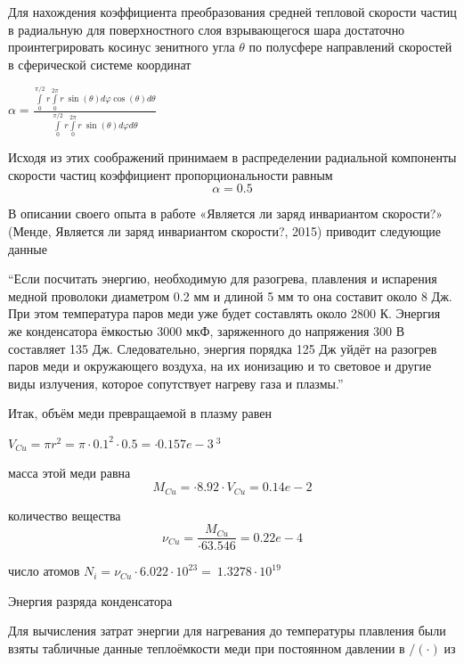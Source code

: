 \documentclass[12pt]{article}
\begin{document}
Для нахождения коэффициента преобразования средней тепловой скорости частиц в радиальную для поверхностного слоя взрывающегося шара достаточно проинтегрировать косинус зенитного угла $\theta$ по полусфере направлений скоростей в сферической системе координат

$\alpha =\frac{\int\limits_{0}^{\pi /2}{r\int\limits_{0}^{2\pi }{r\ \sin \left( \theta  \right)d\varphi \cos \left( \theta  \right)d\theta }}}{\int\limits_{0}^{\pi /2}{r\int\limits_{0}^{2\pi }{r\ \sin \left( \theta  \right)d\varphi d\theta }}}$


Исходя из этих соображений принимаем в распределении радиальной компоненты скорости частиц коэффициент пропорциональности равным $$\alpha = 0.5$$


В описании своего опыта в работе «Является ли заряд инвариантом скорости?» (Менде, Является ли заряд инвариантом скорости?, 2015) приводит следующие данные

“Если посчитать энергию, необходимую для разогрева, плавления и испарения медной проволоки диаметром 0.2 мм и длиной 5 мм то она составит около 8 Дж. При этом температура паров меди уже будет составлять около 2800 К. Энергия же конденсатора ёмкостью 3000 мкФ, заряженного до напряжения 300 В составляет 135 Дж. Следовательно, энергия порядка 125 Дж уйдёт на разогрев паров меди и окружающего воздуха, на их ионизацию и то световое и другие виды излучения, которое сопутствует нагреву газа и плазмы.”

Итак, объём меди превращаемой в плазму равен

${{V}_{Cu}}=\pi {{r}^{2}}=\pi \cdot {{0.1}^{2}}\cdot{ 0.5}=\cdot{0.157e-3}\ {{}^{3}}$

масса этой меди равна \[{{M}_{Cu}}=\cdot{8.92} \cdot {{V}_{Cu}} = {0.14e-2} \]

количество вещества \[{{\nu }_{Cu}}=\frac{{{M}_{Cu}}}{\cdot{63.546}} = {0.22e-4 }\]

число атомов ${{N}_{i}}={{\nu }_{Cu}}\cdot 6.022\cdot {{10}^{23}}=\ 1.3278\cdot {{10}^{19}}$ 

Энергия разряда конденсатора  

Для вычисления затрат энергии для нагревания до температуры плавления были взяты табличные данные теплоёмкости меди при постоянном давлении в ${}/{\left( \cdot  \right)}\;$из  
\end{document}
